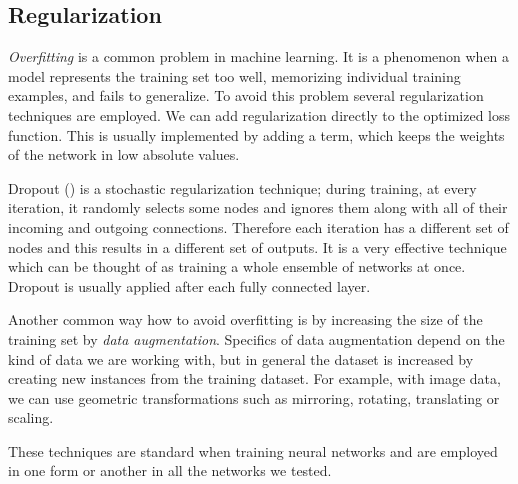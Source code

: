 \subsection{Regularization}
\label{sec:regularization}
\textit{Overfitting} is a common problem in machine learning. It is a phenomenon when a model represents the training set too well, memorizing individual training examples, and fails to generalize. To avoid this problem several regularization techniques are employed. We can add regularization directly to the optimized loss function. This is usually implemented by adding a term, which keeps the weights of the network in low absolute values. \par
Dropout (\cite{srivastava_dropout:_2014}) is a stochastic regularization technique; during training, at every iteration, it randomly selects some nodes and ignores them along with all of their incoming and outgoing connections. Therefore each iteration has a different set of nodes and this results in a different set of outputs. It is a very effective technique which can be thought of as training a whole ensemble of networks at once. Dropout is usually applied after each fully connected layer. \par
Another common way how to avoid overfitting is by increasing the size of the training set by \textit{data augmentation}. Specifics of data augmentation depend on the kind of data we are working with, but in general the dataset is increased by creating new instances from the training dataset. For example, with image data, we can use geometric transformations such as mirroring, rotating, translating or scaling. \par
These techniques are standard when training neural networks and are employed in one form or another in all the networks we tested.

